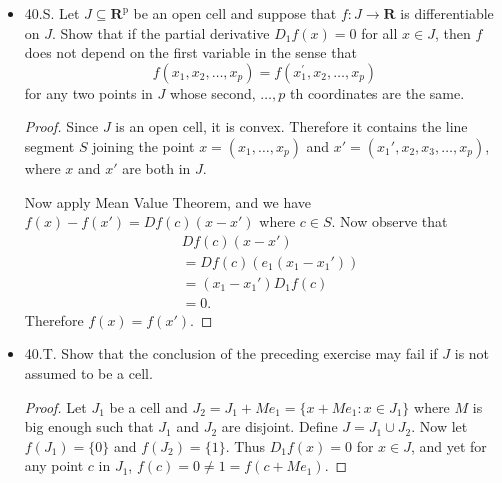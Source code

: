\begin{itemize}
\begin{proof}
	If $\Omega$ is not connected, we can have two disjoint sets $A, B \subset \Omega$ where $f(A) = \{0\}$ and $f(B) = \{1\} $. Now $Df(x) = 0$ and $f$ is nonconstant.
\end{proof}


\item 40.S. Let $J \subseteq \mathbf{R}^{\mathrm{p}}$ be an open cell and suppose that $f: J \rightarrow \boldsymbol{R}$ is differentiable on $J$. Show that if the partial derivative $D_1 f(x)=0$ for all $x \in J$, then $f$ does not depend on the first variable in the sense that
\[
f\left(x_1, x_2, \ldots, x_p\right)=f\left(x_1^{\prime}, x_2, \ldots, x_p\right)
\]
for any two points in $J$ whose second, $\ldots, p$ th coordinates are the same.
\begin{proof}
	Since $J$ is an open cell, it is convex. Therefore it contains the line segment $S$ joining the point $x = (x_1, \ldots, x_p)$ and $x' = (x_1', x_2, x_3, \ldots, x_p)$, where $x$ and $x'$ are both in $J$. 

	Now apply Mean Value Theorem, and we have $f(x) - f(x') = Df(c) (x - x')$ where $c \in S$. Now observe that
	\begin{align*}
		&Df(c) (x - x')\\
		&= Df(c) \left(e_1(x_1 - x_1')\right)\\
		&= (x_1 - x_1')D_1f(c) \\
		&= 0
	.\end{align*}
	Therefore $f(x) = f(x')$.
\end{proof}


\item 40.T. Show that the conclusion of the preceding exercise may fail if $J$ is not assumed to be a cell.
\begin{proof}
	Let $J_1$ be a cell and  $J_2 = J_1 + M e_1 = \{x + Me_1: x \in J_1\} $ where $M$ is big enough such that $J_1$ and $J_2$ are disjoint. Define $J = J_1 \cup J_2$. Now let $f(J_1) = \{0\} $ and $f(J_2) = \{1\} $. Thus $D_1f(x) = 0$ for $x \in J$, and yet for any point $c$ in $J_1$, $f(c) = 0 \neq 1 = f(c+Me_1)$. 
\end{proof}


\end{itemize}
